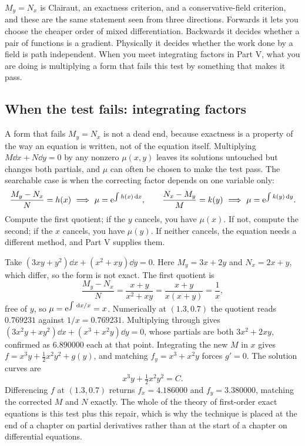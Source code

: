 \begin{keynote}
$M_{y}=N_{x}$ is Clairaut, an exactness criterion, and a conservative-field criterion, and these are the same statement seen from three directions. Forwards it lets you choose the cheaper order of mixed differentiation. Backwards it decides whether a pair of functions is a gradient. Physically it decides whether the work done by a field is path independent. When you meet integrating factors in Part V, what you are doing is multiplying a form that fails this test by something that makes it pass.
\end{keynote}

\subsection{When the test fails: integrating factors}

A form that fails $M_{y}=N_{x}$ is not a dead end, because exactness is a property of the way an equation is written, not of the equation itself. Multiplying $M\dd x+N\dd y=0$ by any nonzero $\mu(x,y)$ leaves its solutions untouched but changes both partials, and $\mu$ can often be chosen to make the test pass. The searchable case is when the correcting factor depends on one variable only:
\[
\frac{M_{y}-N_{x}}{N}=h(x)\ \Longrightarrow\ \mu=\eu^{\int h(x)\dd x},
\qquad
\frac{N_{x}-M_{y}}{M}=k(y)\ \Longrightarrow\ \mu=\eu^{\int k(y)\dd y}.
\]
Compute the first quotient; if the $y$ cancels, you have $\mu(x)$. If not, compute the second; if the $x$ cancels, you have $\mu(y)$. If neither cancels, the equation needs a different method, and Part V supplies them.

Take $(3xy+y^{2})\dd x+(x^{2}+xy)\dd y=0$. Here $M_{y}=3x+2y$ and $N_{x}=2x+y$, which differ, so the form is not exact. The first quotient is
\[
\frac{M_{y}-N_{x}}{N}=\frac{x+y}{x^{2}+xy}=\frac{x+y}{x(x+y)}=\frac1x ,
\]
free of $y$, so $\mu=\mathrm{e}^{\int\,\mathrm{d} x/x}=x$. Numerically at $(1.3,0.7)$ the quotient reads $0.769231$ against $1/x=0.769231$. Multiplying through gives $(3x^{2}y+xy^{2})\dd x+(x^{3}+x^{2}y)\dd y=0$, whose partials are both $3x^{2}+2xy$, confirmed as $6.890000$ each at that point. Integrating the new $M$ in $x$ gives $f=x^{3}y+\tfrac12x^{2}y^{2}+g(y)$, and matching $f_{y}=x^{3}+x^{2}y$ forces $g'=0$. The solution curves are
\[
x^{3}y+\tfrac12x^{2}y^{2}=C .
\]
Differencing $f$ at $(1.3,0.7)$ returns $f_{x}=4.186000$ and $f_{y}=3.380000$, matching the corrected $M$ and $N$ exactly. The whole of the theory of first-order exact equations is this test plus this repair, which is why the technique is placed at the end of a chapter on partial derivatives rather than at the start of a chapter on differential equations.

